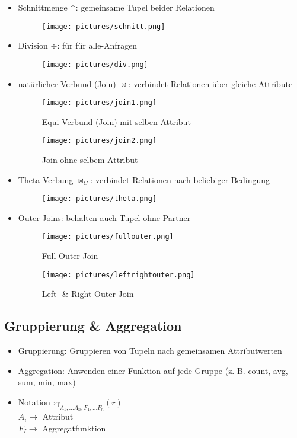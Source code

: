 \documentclass[12pt,a4paper]{article}
\begin{document}
\begin{itemize}
\item Schnittmenge $\cap$: gemeinsame Tupel beider Relationen
\begin{figure}[H]
\centering
\texttt{[image: pictures/schnitt.png]}
\end{figure}
\item Division $\div$: für \glqq für alle\grqq -Anfragen
\begin{figure}[H]
\centering
\texttt{[image: pictures/div.png]}
\end{figure}
\item natürlicher Verbund (Join) $\bowtie$: verbindet Relationen über gleiche Attribute
\begin{figure}[H]
\begin{minipage}[t]{.5\textwidth}
\centering
\texttt{[image: pictures/join1.png]}
\caption{Equi-Verbund (Join) mit selben Attribut}
\end{minipage}
\hfill
\begin{minipage}[t]{.5\textwidth}
\centering
\texttt{[image: pictures/join2.png]}
\caption{Join ohne selbem Attribut}
\end{minipage}
\end{figure}
\item Theta-Verbung $\bowtie_C$: verbindet Relationen nach beliebiger Bedingung
\begin{figure}[H]
\centering
\texttt{[image: pictures/theta.png]}
\end{figure}
\newpage
\item Outer-Joins: behalten auch Tupel ohne Partner
\begin{figure}[H]
\begin{minipage}[t]{.45\textwidth}
\centering
\texttt{[image: pictures/fullouter.png]}
\caption{Full-Outer Join}
\end{minipage}
\hfill
\begin{minipage}[t]{.45\textwidth}
\centering
\texttt{[image: pictures/leftrightouter.png]}
\caption{Left- \& Right-Outer Join}
\end{minipage}
\end{figure}
\end{itemize}

\subsection{Gruppierung \& Aggregation}

\begin{itemize}
\item Gruppierung: Gruppieren von Tupeln nach gemeinsamen Attributwerten
\item Aggregation: Anwenden einer Funktion auf jede Gruppe (z. B. count, avg, sum, min, max)
\item Notation :$\gamma_{A_1,...A_n;F_1,...F_n}(r)$ \\
$A_i \rightarrow$ Attribut \\
$F_I \rightarrow$ Aggregatfunktion
\end{itemize}
\end{document}
